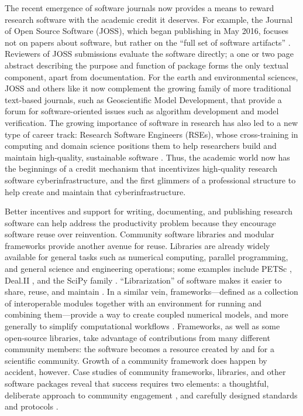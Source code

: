 \documentclass[12pt]{amsart}
\begin{document}
The recent emergence of software journals now provides a means to reward research software with the academic credit it deserves. For example, the Journal of Open Source Software (JOSS), which began publishing in May 2016, focuses not on papers about software, but rather on the ``full set of software artifacts'' \citep{smith2018journal}. Reviewers of JOSS submissions evaluate the software directly; a one or two page abstract describing the purpose and function of package forms the only textual component, apart from documentation. For the earth and environmental sciences, JOSS and others like it now complement the growing family of more traditional text-based journals, such as Geoscientific Model Development, that provide a forum for software-oriented issues such as algorithm development and model verification. The growing importance of software in research has also led to a new type of career track: Research Software Engineers (RSEs), whose cross-training in computing and domain science positions them to help researchers build and maintain high-quality, sustainable software \citep{baxter2012research}. Thus, the academic world now has the beginnings of a credit mechanism that incentivizes high-quality research software cyberinfrastructure, and the first glimmers of a professional structure to help create and maintain that cyberinfrastructure. 

Better incentives and support for writing, documenting, and publishing research software can help address the productivity problem because they encourage software reuse over reinvention. Community software libraries and modular frameworks provide another avenue for reuse. Libraries are already widely available for general tasks such as numerical computing, parallel programming, and general science and engineering operations; some examples include PETSc \citep{abhyankar2018petsc}, Deal.II \citep{bangerth2007deal}, and the SciPy family \citep{2020SciPy-NMeth}. ``Librarization'' of software makes it easier to share, reuse, and maintain \citep{brown2014run}. In a similar vein, frameworks---defined as a collection of interoperable modules together with an environment for running and combining them---provide a way to create coupled numerical models, and more generally to simplify computational workflows \citep[e.g.,][]{leavesley1996modular,voinov2004modular,peckham2013component}. Frameworks, as well as some open-source libraries, take advantage of contributions from many different community members: the software becomes a resource created by and for a scientific community. Growth of a community framework does happen by accident, however. Case studies of community frameworks, libraries, and other software packages reveal that success requires two elements: a thoughtful, deliberate approach to community engagement \citep{bangerth2013makes,turk2013scaling,lawrence2015science}, and carefully designed standards and protocols \citep{peckham2013component,harpham2019introductory}.
\end{document}
